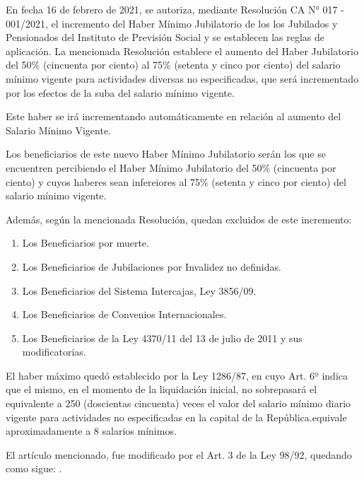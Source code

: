 En fecha 16 de febrero de 2021, se autoriza, mediante Resolución CA N° 017 - 001/2021, el incremento del Haber Mínimo Jubilatorio de los los Jubilados y Pensionados del Instituto de Previsión Social y se establecen las reglas de aplicación. La mencionada Resolución establece el aumento del Haber Jubilatorio del 50\% (cincuenta por ciento) al 75\% (setenta y cinco por ciento) del salario mínimo vigente para actividades diversas no especificadas, que será incrementado por los efectos de la suba del salario mínimo vigente.

Este haber se irá incrementando automáticamente en relación al aumento del Salario Mínimo Vigente.

Los beneficiarios de este nuevo Haber Mínimo Jubilatorio serán los que se encuentren percibiendo el Haber Mínimo Jubilatorio del 50\%  (cincuenta por ciento) y cuyos haberes sean infereiores al 75\% (setenta y cinco por ciento) del salario mínimo vigente. 

Además, según la mencionada Resolución, quedan excluidos de este incremento: 

\begin{enumerate}[label=\alph*.]

\item Los Beneficiarios por muerte.

\item Los Beneficiarios de Jubilaciones por Invalidez no definidas.

\item Los Beneficiarios del Sistema Intercajas, Ley 3856/09.

\item Los Beneficiarios de Convenios Internacionales.

\item Los Beneficiarios de la Ley 4370/11 del 13 de julio de 2011 y sus modificatorias.

\end{enumerate}

El haber máximo quedó establecido por la Ley 1286/87, en cuyo Art. 6º indica que el mismo, en el momento de la liquidación inicial, no sobrepasará el equivalente a 250  (doscientas cincuenta) veces el valor del salario mínimo diario vigente para actividades no especificadas en la capital de la República.equivale aproximadamente a 8 salarios mínimos.

El artículo mencionado, fue modificado por el Art. 3 de la Ley 98/92, quedando como sigue: .


